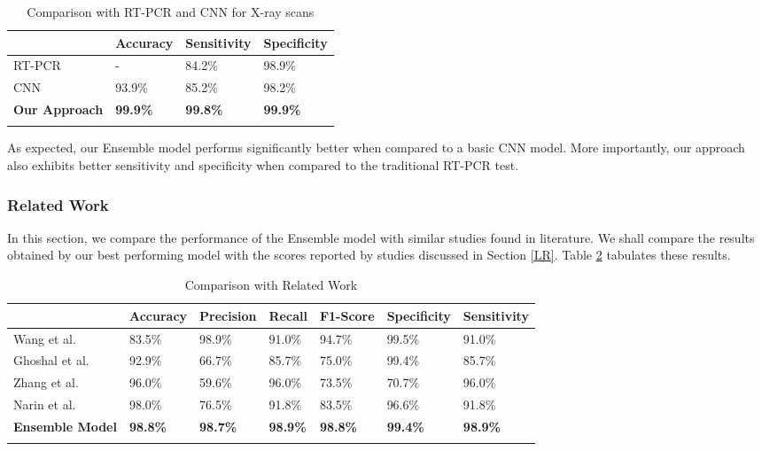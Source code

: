 \begin{longtable}{| p{} | p{} |  p{} |   p{} |} 
    \hline
& \textbf{Accuracy} & \textbf{Sensitivity} & \textbf{Specificity} \\
\hline

			RT-PCR      &-   &84.2\%    &98.9\%  
\\\hline
			CNN    &93.9\%   &85.2\%    &98.2\% 
\\\hline
			\textbf{Our Approach}   &\textbf{99.9\%}   &\textbf{99.8\%}    &\textbf{99.9\%} 
\\\hline
 \caption{Comparison with RT-PCR and CNN for X-ray scans}  \label{tab:comp}
    \end{longtable}
\vspace{-1em}
As expected, our Ensemble model performs significantly better when compared to a basic CNN model. More importantly, our approach also exhibits better sensitivity and specificity when compared to the traditional RT-PCR test.

\subsubsection{Related Work}

In this section, we compare the performance of the Ensemble model with similar studies found in literature. We shall compare the results obtained by our best performing model with the scores reported by studies discussed in Section \ref{LR}. Table \ref{tab:relWorkXray} tabulates these results.

\vspace{1em}
 \begin{longtable}{| p{} |  p{} |   p{} | p{} | p{} | p{} | p{} |} 
    \hline
& \textbf{Accuracy} & \textbf{Precision} & \textbf{Recall} & \textbf{F1-Score} & \textbf{Specificity} & \textbf{Sensitivity} \\
\hline
Wang et al. \cite{LWA2020}   &83.5\%    &98.9\%     &91.0\%   &94.7\%    &99.5\%     &91.0\%
\\\hline

Ghoshal et al. \cite{GHT2020}   &92.9\%    &66.7\%     &85.7\%   &75.0\%    &99.4\%     &85.7\%
\\\hline
Zhang et al. \cite{ZXS+2020}   &96.0\%    &59.6\%     &96.0\%   &73.5\%    &70.7\%     &96.0\%
\\\hline
Narin et al. \cite{AKP2020}   &98.0\%    &76.5\%     &91.8\%   &83.5\%    &96.6\%     &91.8\%
\\\hline
\textbf{Ensemble Model}    &\textbf{98.8\%}   &\textbf{98.7\%}    &\textbf{98.9\%}    &\textbf{98.8\%}   &\textbf{99.4\%}   &\textbf{98.9\%} 
\\\hline
 \caption{Comparison with Related Work}  \label{tab:relWorkXray}

    \end{longtable}
\vspace{-2em}

